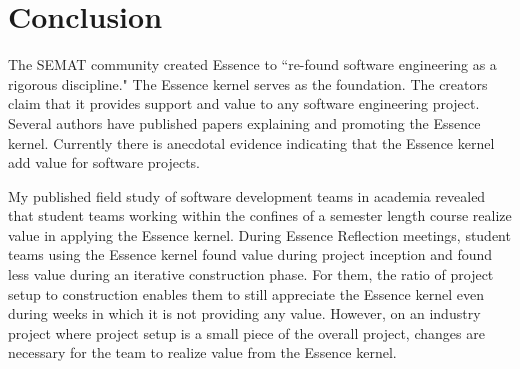 \documentclass[preprint,12pt,3p]{elsarticle}
\begin{document}


\section{Conclusion}
\label{Conclusions}

The SEMAT community created Essence to ``re-found software engineering as a rigorous discipline." The Essence kernel serves as the foundation. The creators claim that it provides support and value to any software engineering project.  Several authors have published papers explaining and promoting the Essence kernel. Currently there is anecdotal evidence indicating that the Essence kernel add value for software projects. 

My published field study of software development teams in academia revealed that student teams working within the confines of a semester length course realize value in applying the Essence kernel. During Essence Reflection meetings, student teams using the Essence kernel found value during project inception and found less value during an iterative construction phase. For them, the ratio of project setup to construction enables them to still appreciate the Essence kernel even during weeks in which it is not providing any value. However, on an industry project where project setup is a small piece of the overall project, changes are necessary for the team to realize value from the Essence kernel.
\end{document}
